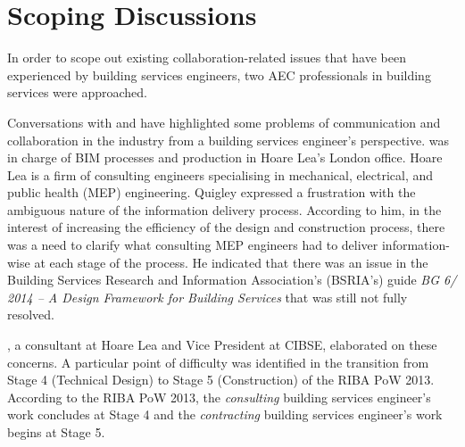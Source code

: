 \chapter{Scoping Discussions} %

\label{Chapter3} %


In order to scope out existing collaboration-related issues that have been experienced by building services engineers, two AEC professionals in building services were approached.

Conversations with \cite{Quigley2017} and \cite{Conaghan2017} have highlighted some problems of communication and collaboration in the industry from a building services engineer's perspective.
\cite{Quigley2017} was in charge of BIM processes and production in Hoare Lea's London office.
Hoare Lea is a firm of consulting engineers specialising in mechanical, electrical, and public health (MEP) engineering.
Quigley expressed a frustration with the ambiguous nature of the information delivery process.
According to him, in the interest of increasing the efficiency of the design and construction process, there was a need to clarify what consulting MEP engineers had to deliver information-wise at each stage of the process.
He indicated that there was an issue in the Building Services Research and Information Association's (BSRIA's) guide \textit{BG 6/ 2014 – A Design Framework for Building Services} that was still not fully resolved.

\cite{Conaghan2017}, a consultant at Hoare Lea and Vice President at CIBSE, elaborated on these concerns.
A particular point of difficulty was identified in the transition from Stage 4 (Technical Design) to Stage 5 (Construction) of the RIBA PoW 2013.
According to the RIBA PoW 2013, the \textit{consulting} building services engineer's work concludes at Stage 4 and the \textit{contracting} building services engineer's work begins at Stage 5.

